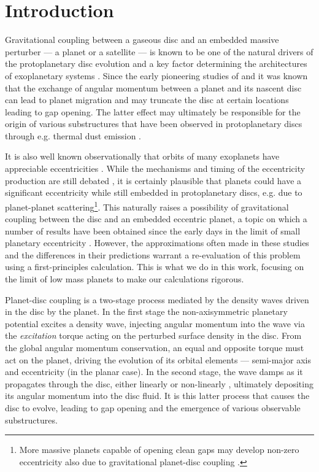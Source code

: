 \section{Introduction}
\label{sec:background}


Gravitational coupling between a gaseous disc and an embedded massive perturber --- a planet or a satellite --- is known to be one of the natural drivers of the protoplanetary disc evolution and a key factor determining the architectures of exoplanetary systems \citep{Paardekooper20232023}. Since the early pioneering studies of \citet{GoldreichTremaine_1979,GoldreichTremaine_1980} and \citet{Lin1979} it was known that the exchange of angular momentum between a planet and its nascent disc can lead to planet migration and may truncate the disc at certain locations leading to gap opening. The latter effect may ultimately be responsible for the origin of various substructures that have been observed in protoplanetary discs through e.g. thermal dust emission \citep{AndrewsEtAl_2018,Andrews2020}.

It is also well known observationally that orbits of many exoplanets have appreciable eccentricities \citep{Santos2007,Xie2016}. While the mechanisms and timing of the eccentricity production are still debated \citep{Davies2014}, it is certainly plausible that planets could have a significant eccentricity while still embedded in protoplanetary discs, e.g. due to planet-planet scattering\footnote{More massive planets capable of opening clean gaps may develop non-zero eccentricity also due to gravitational planet-disc coupling \citep{Goldreich2003,Ragusa2018}.}. This naturally raises a possibility of gravitational coupling between the disc and an embedded eccentric planet, a topic on which a number of results have been obtained since the early days in the limit of small planetary eccentricity \citep{GoldreichTremaine_1980,Ward_1986,Artymowicz_1993}. However, the approximations often made in these studies and the differences in their predictions \citep{PapaloizouLarwood_2000,CresswellNelson_2006,IdaEtAl_2020} warrant a re-evaluation of this problem using a first-principles calculation. This is what we do in this work, focusing on the limit of low mass planets to make our calculations rigorous.

Planet-disc coupling is a two-stage process mediated by the density waves driven in the disc by the planet. In the first stage the non-axisymmetric planetary potential excites a density wave, injecting angular momentum into the wave via the {\it excitation} torque acting on the perturbed surface density in the disc. From the global angular momentum conservation, an equal and opposite torque must act on the planet, driving the evolution of its orbital elements --- semi-major axis and eccentricity (in the planar case). In the second stage, the wave damps as it propagates through the disc, either linearly \citep{Takeuchi1996,MirandaRafikov_2020} or non-linearly \citep{GoodmanRafikov_2001,Rafikov2002a}, ultimately depositing its angular momentum into the disc fluid. It is this latter process that causes the disc to evolve, leading to gap opening and the emergence of various observable substructures. 

